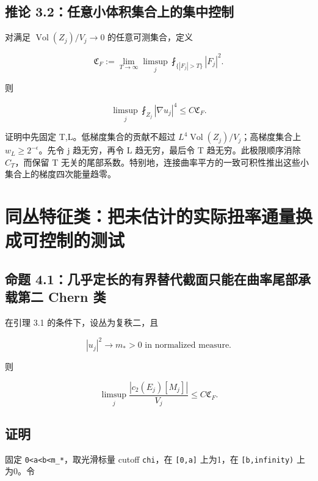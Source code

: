 \documentclass[UTF8,11pt,openany,oneside,fontset=none]{ctexbook}
\begin{document}
\subsection{推论 3.2：任意小体积集合上的集中控制}\label{ch2:ux63a8ux8bba-3.2ux4efbux610fux5c0fux4f53ux79efux96c6ux5408ux4e0aux7684ux96c6ux4e2dux63a7ux5236}

对满足 \(\operatorname{Vol}(Z_j)/V_j\to0\) 的任意可测集合，定义

\[
 \mathfrak C_F:=\lim_{T\to\infty}\limsup_j
 \fint_{\{|F_j|>T\}}|F_j|^2.
\]

则

\[
 \boxed{
 \limsup_j\fint_{Z_j}|\nabla u_j|^4\le C\mathfrak C_F.}
 \tag{2.17}\label{eq:r2:17}
\]

证明中先固定 T,L。低梯度集合的贡献不超过 \(L^4\operatorname{Vol}(Z_j)/V_j\)；高梯度集合上 \(w_L\ge2^{-\epsilon}\)。先令 j 趋无穷，再令 L 趋无穷，最后令 T 趋无穷。此极限顺序消除 \(C_T\)，而保留 T 无关的尾部系数。特别地，连接曲率平方的一致可积性推出这些小集合上的梯度四次能量趋零。

\section{同丛特征类：把未估计的实际扭率通量换成可控制的测试}\label{ch2:ux540cux4e1bux7279ux5f81ux7c7bux628aux672aux4f30ux8ba1ux7684ux5b9eux9645ux626dux7387ux901aux91cfux6362ux6210ux53efux63a7ux5236ux7684ux6d4bux8bd5}

\subsection{命题 4.1：几乎定长的有界替代截面只能在曲率尾部承载第二 Chern 类}\label{ch2:ux547dux9898-4.1ux51e0ux4e4eux5b9aux957fux7684ux6709ux754cux66ffux4ee3ux622aux9762ux53eaux80fdux5728ux66f2ux7387ux5c3eux90e8ux627fux8f7dux7b2cux4e8c-chern-ux7c7b}

在引理 3.1 的条件下，设丛为复秩二，且

\[
 |u_j|^2\longrightarrow m_*>0\text{ in normalized measure}.
\]

则

\[
 \boxed{
 \limsup_j\frac{|c_2(E_j)[M_j]|}{V_j}
 \le C\mathfrak C_F.}
 \tag{2.18}\label{eq:r2:18}
\]

\subsection{证明}\label{ch2:ux8bc1ux660e-2}

固定 \texttt{0\textless{}a\textless{}b\textless{}m\_*}，取光滑标量 cutoff \texttt{chi}，在 \texttt{{[}0,a{]}} 上为1，在 \texttt{{[}b,infinity)} 上为0。令
\end{document}
